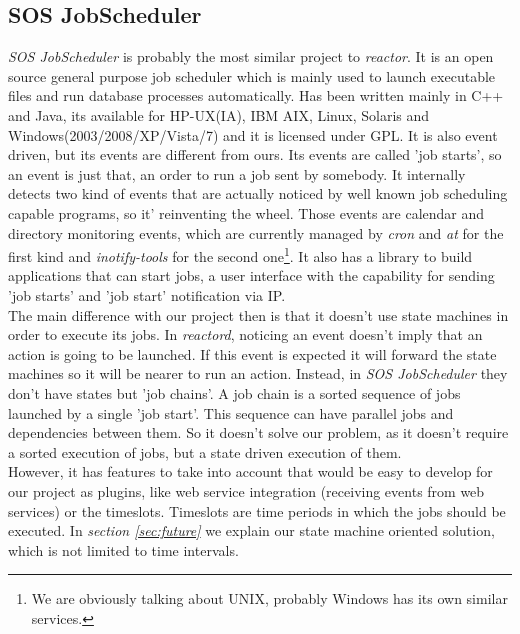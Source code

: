 \subsection{SOS JobScheduler}
\emph{SOS JobScheduler}\cite{sos:js} is probably the most similar project to \emph{reactor}. It is an open source general purpose job 
scheduler which is mainly used to launch executable files and run database processes automatically. Has been written mainly in C++ and 
Java, its available for HP-UX(IA), IBM AIX, Linux, Solaris and Windows(2003/2008/XP/Vista/7) and it is licensed under GPL. 
It is also event driven, but its events
are different from ours. Its events are called 'job starts', so an event is just that, an order to run a job sent by somebody. It 
internally detects two kind of events that are actually noticed by well known job scheduling capable programs, so it' reinventing the
wheel. Those events are calendar and directory monitoring events, which are currently managed by \emph{cron} and \emph{at} for the first 
kind and \emph{inotify-tools} for the second one\footnote{We are obviously talking about UNIX, probably Windows has its own similar 
services.}. It also has a library to build applications that can start jobs, a user interface with the capability for sending 'job starts'
and 'job start' notification via IP.\\
The main difference with our project then is that it doesn't use state machines in order to execute its jobs. In \emph{reactord}, noticing
an event doesn't imply that an action is going to be launched. If this event is expected it will forward the state machines so it will be
nearer to run an action. Instead, in \emph{SOS JobScheduler} they don't have states but 'job chains'. A job chain is a sorted sequence of 
jobs launched by a single 'job start'. This sequence can have parallel jobs and dependencies between them. So it doesn't solve our problem,
as it doesn't require a sorted execution of jobs, but a state driven execution of them.\\
However, it has features to take into account that would be easy to develop for our project as plugins, like web service integration 
(receiving events from web services) or the timeslots. Timeslots are time periods in which the jobs should be executed. In \emph
{section \ref{sec:future}} we explain our state machine oriented solution, which is not limited to time intervals.
